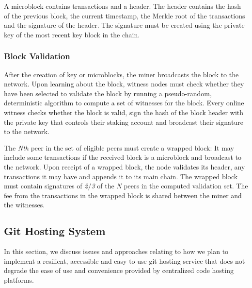 A microblock contains transactions and a header. The header contains the hash of the previous block, the current timestamp, the Merkle root of the transactions and the signature of the header. The signature must be created using the private key of the most recent key block in the chain.

\subsubsection{Block Validation}
After the creation of key or microblocks, the miner broadcasts the block to the network. Upon learning about the block, witness nodes must check whether they have been selected to validate the block by running a pseudo-random, deterministic algorithm to compute a set of witnesses for the block. Every online witness checks whether the block is valid, sign the hash of the block header with the private key that controls their staking account and broadcast their signature to the network.

The \textit{Nth} peer in the set of eligible peers must create a wrapped block: It may include some transactions if the received block is a microblock and broadcast to the network. Upon receipt of a wrapped block, the node validates its header, any transactions it may have and appends it to its main chain. The wrapped block must contain signatures of \textit{2}/\textit{3} of the \textit{N} peers in the computed validation set. The fee from the transactions in the wrapped block is shared between the miner and the witnesses.

 
 \subsection{Git Hosting System}
 In this section, we discuss issues and approaches relating to how we plan to implement a resilient, accessible and easy to use git hosting service that does not degrade the ease of use and convenience provided by centralized code hosting platforms.
 

